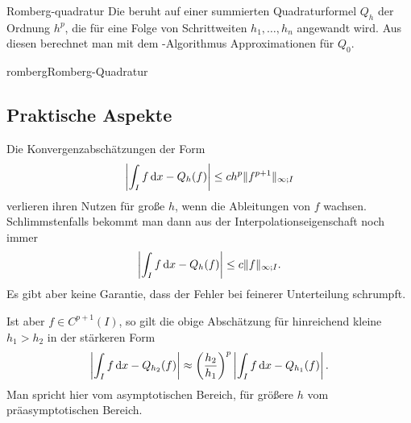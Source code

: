 \begin{Definition}{Romberg-quadratur}
  Die  beruht auf einer summierten
  Quadraturformel $Q_h$ der Ordnung $h^p$, die für eine Folge von
  Schrittweiten $h_1,\dots, h_n$ angewandt wird. Aus diesen berechnet
  man mit dem -Algorithmus Approximationen für
  $Q_0$.
\end{Definition}

\begin{Algorithmus*}{romberg}{Romberg-Quadratur}
  
\end{Algorithmus*}

\subsection{Praktische Aspekte}

\begin{remark}
  Die Konvergenzabschätzungen der Form
  \begin{gather}
    \left|\int_I f\,\mathrm{d} x - Q_h(f)\right| \le c h^p \lVert f^{p+1}\rVert_{\infty;I}
  \end{gather}
  verlieren ihren Nutzen für große $h$, wenn die Ableitungen von $f$
  wachsen. Schlimmstenfalls bekommt man dann aus der
  Interpolationseigenschaft noch immer
  \begin{gather}
    \left|\int_I f\,\mathrm{d} x - Q_h(f)\right| \le c \lVert f\rVert_{\infty;I}.
  \end{gather}
  Es gibt aber keine Garantie, dass der Fehler bei feinerer
  Unterteilung schrumpft.
  
  Ist aber $f\in C^{p+1}(I)$, so gilt die obige Abschätzung für
  hinreichend kleine $h_1>h_2$ in der stärkeren Form
  \begin{gather}
    \left|\int_I f\,\mathrm{d} x - Q_{h_2}(f)\right|
    \approx \left(\frac{h_2}{h_1}\right)^p
    \left|\int_I f\,\mathrm{d} x - Q_{h_1}(f)\right|.
  \end{gather}
  Man spricht hier vom asymptotischen Bereich, für größere $h$ vom
  präasymptotischen Bereich.
\end{remark}

